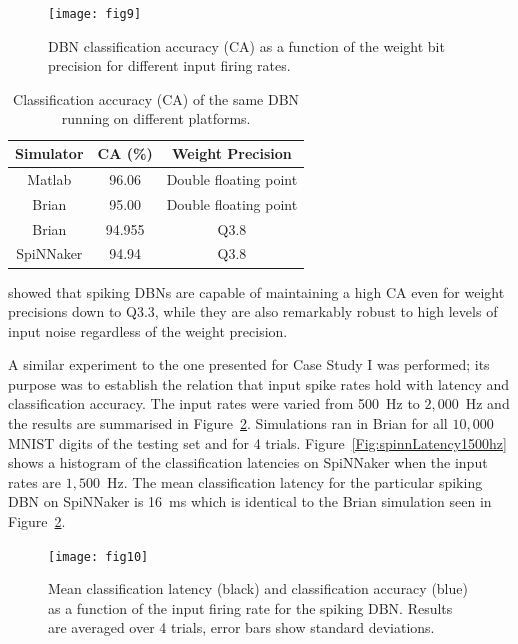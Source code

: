\documentclass{frontiersENG} %
\begin{document}
\begin{figure}[hbt!]
	\centering
	\texttt{[image: fig9]}
	\caption{DBN classification accuracy (CA) as a function of the weight bit precision for different input firing rates.}
	\label{Fig:brianCAfiringrate}
\end{figure} 


\begin{table}[h]
	\caption{Classification accuracy (CA) of the same DBN running on different platforms.}
	\begin{center}
    \bgroup
    \def\arraystretch{1.4}
		\begin{tabular} {c c c}
			Simulator & CA (\%) & Weight Precision \\
			\hline
			Matlab & 96.06 & Double floating point\\
			Brian & 95.00 & Double floating point\\
			Brian & 94.955 & Q3.8\\
			SpiNNaker & 94.94 & Q3.8\\
		\end{tabular}
    \egroup
		\label{tab:casimulators}
	\end{center}
\end{table}

\citet{stromatias2015robustness} showed that spiking DBNs are capable of maintaining a high CA even for weight precisions down to Q3.3, while they are also remarkably robust to high levels of input noise regardless of the weight precision. 

A similar experiment to the one presented for Case Study I was performed; its purpose was to establish the relation that input spike rates hold with latency and classification accuracy.
The input rates were varied from 500~Hz to $2,000$~Hz and the results are summarised in Figure~\ref{Fig:brianLatency}. Simulations ran in Brian for all $10,000$ MNIST digits of the testing set and for 4 trials. Figure~\ref{Fig:spinnLatency1500hz} shows a histogram of the classification latencies on SpiNNaker when the input rates are $1,500$~Hz. The mean classification latency for the particular spiking DBN on SpiNNaker is 16~ms which is identical to the Brian simulation seen in Figure~\ref{Fig:brianLatency}.


\begin{figure}[hbt!]
	\centering
	\texttt{[image: fig10]}
	\caption{Mean classification latency (black) and classification accuracy (blue) as a function of the input firing rate for the spiking DBN. Results are averaged over 4 trials, error bars show standard deviations.}
	\label{Fig:brianLatency}
\end{figure} 
\end{document}
